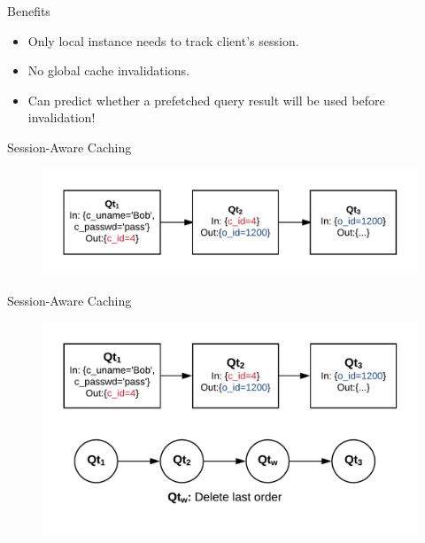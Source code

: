 \documentclass[10pt]{beamer}
\begin{document}
\begin{frame}[fragile]{Benefits}
    \begin{itemize}
        \item{Only \alert{local instance} needs to track client's session.}
        \item{No global cache invalidations.}
        \item{Can predict whether a prefetched query result will be used before invalidation!}
    \end{itemize}
\end{frame}

\begin{frame}[fragile]{Session-Aware Caching}
    \begin{figure}
        \includegraphics[scale=0.22]{apollo_query_pipeline}
    \end{figure}
\end{frame}

\begin{frame}[fragile]{Session-Aware Caching}
    \begin{figure}
        \center
        \includegraphics[scale=0.22]{apollo_write_boundary}
    \end{figure}
\end{frame}
\end{document}
